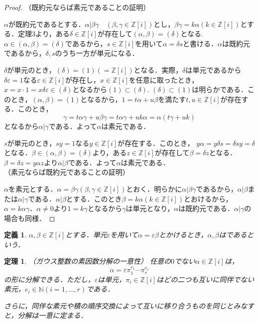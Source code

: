 \documentclass[dvipdfmx]{jsarticle}
\newtheorem{theorem}{定理}
\newtheorem{defnition}{定義}
\begin{document}
\begin{proof}

（既約元ならば素元であることの証明）

$\alpha$が既約元であるとする．$\alpha|\beta\gamma\quad(\beta,\gamma\in\mathbb{Z}[i])$とし，$\beta\gamma=k\alpha(k\in\mathbb{Z}[i])$とする．定理3より，ある$\delta\in\mathbb{Z}[i]$が存在して$(\alpha,\beta)=(\delta)$となる.
$\alpha\in(\alpha,\beta)=(\delta)$であるから，$s\in\mathbb{Z}[i]$を用いて$\alpha=\delta s$と書ける．$\alpha$は既約元であるから，$\delta,s$のうち一方が単元になる．

$\delta$が単元のとき，$(\delta)=(1)(=\mathbb{Z}[i])$となる．実際，$\delta$は単元であるから$\delta\varepsilon=1$なる$\varepsilon\in\mathbb{Z}[i]$が存在し，$x\in\mathbb{Z}[i]$を任意に取ったとき，$x=x\cdot1=x\delta\varepsilon\in(\delta)$となるから$(1)\subset(\delta)$.
$(\delta)\subset(1)$は明らかである．このとき，$(\alpha,\beta)=(1)$となるから，$1=t\alpha+u\beta$を満たす$t,u\in\mathbb{Z}[i]$が存在する．このとき，$$\gamma=t\alpha\gamma+u\beta\gamma=t\alpha\gamma+uk\alpha=\alpha(t\gamma+uk)$$
となるから$\alpha|\gamma$である．よって$\alpha$は素元である．

$s$が単元のとき，$sy=1$なる$y\in\mathbb{Z}[i]$が存在する．このとき，
$y\alpha=y\delta s=\delta sy=\delta$となる．$\beta\in(\alpha,\beta)=(\delta)$より，ある$z\in\mathbb{Z}[i]$が存在して$\beta=\delta z$となる．$\beta=\delta z=y\alpha z$より$\alpha|\beta$である．よって$\alpha$は素元である．\\



（素元ならば既約元であることの証明）

$\alpha$を素元とする．$\alpha=\beta\gamma(\beta,\gamma\in\mathbb{Z}[i])$とおく．明らかに$\alpha|\beta\gamma$であるから，$\alpha|\beta$または$\alpha|\gamma$である．$\alpha|\beta$とする．このとき$\beta=k\alpha(k\in\mathbb{Z}[i])$とおけるから，
$\alpha=k\alpha\gamma$．$\alpha\neq0$より$1=k\gamma$となるから$\gamma$は単元となり，$\alpha$は既約元である．$\alpha|\gamma$の場合も同様．
\end{proof}

\begin{defnition}

$\alpha,\beta\in\mathbb{Z}[i]$とする．単元$\varepsilon$を用いて$\alpha=\varepsilon\beta$とかけるとき，$\alpha,\beta$はであるという．
\end{defnition}

\begin{theorem}{（ガウス整数の素因数分解の一意性）}
任意の$0$でない$\alpha\in\mathbb{Z}[i]$は，
$$\alpha=\varepsilon\pi_1^{e_1}\cdots\pi_r^{e_r}$$
の形に分解できる．ただし，$\varepsilon$は単元，$\pi_i\in\mathbb{Z}[i]$はどの二つも互いに同伴でない素元，$e_i\in\mathbb{N}(i=1,\ldots, r)$である．

さらに，同伴な素元や積の順序交換によって互いに移り合うものを同じとみなすと，分解は一意に定まる．
\end{theorem}
\end{document}
